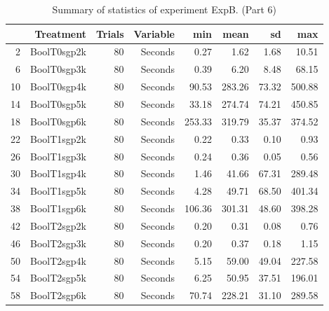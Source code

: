 \begin{table}[ht]
\centering
\begin{tabular}{rrrrrrrr}
  \hline
 & Treatment & Trials & Variable & min & mean & sd & max \\ 
  \hline
2 & BoolT0sgp2k &  80 & Seconds & 0.27 & 1.62 & 1.68 & 10.51 \\ 
  6 & BoolT0sgp3k &  80 & Seconds & 0.39 & 6.20 & 8.48 & 68.15 \\ 
  10 & BoolT0sgp4k &  80 & Seconds & 90.53 & 283.26 & 73.32 & 500.88 \\ 
  14 & BoolT0sgp5k &  80 & Seconds & 33.18 & 274.74 & 74.21 & 450.85 \\ 
  18 & BoolT0sgp6k &  80 & Seconds & 253.33 & 319.79 & 35.37 & 374.52 \\ 
  22 & BoolT1sgp2k &  80 & Seconds & 0.22 & 0.33 & 0.10 & 0.93 \\ 
  26 & BoolT1sgp3k &  80 & Seconds & 0.24 & 0.36 & 0.05 & 0.56 \\ 
  30 & BoolT1sgp4k &  80 & Seconds & 1.46 & 41.66 & 67.31 & 289.48 \\ 
  34 & BoolT1sgp5k &  80 & Seconds & 4.28 & 49.71 & 68.50 & 401.34 \\ 
  38 & BoolT1sgp6k &  80 & Seconds & 106.36 & 301.31 & 48.60 & 398.28 \\ 
  42 & BoolT2sgp2k &  80 & Seconds & 0.20 & 0.31 & 0.08 & 0.76 \\ 
  46 & BoolT2sgp3k &  80 & Seconds & 0.20 & 0.37 & 0.18 & 1.15 \\ 
  50 & BoolT2sgp4k &  80 & Seconds & 5.15 & 59.00 & 49.04 & 227.58 \\ 
  54 & BoolT2sgp5k &  80 & Seconds & 6.25 & 50.95 & 37.51 & 196.01 \\ 
  58 & BoolT2sgp6k &  80 & Seconds & 70.74 & 228.21 & 31.10 & 289.58 \\ 
   \hline
\end{tabular}
\caption{Summary of statistics of experiment ExpB. (Part 6)} 
\end{table}
